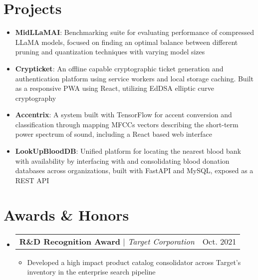 \documentclass[letterpaper,11pt]{article}
\makeatletter
\newcommand{\resumeItem}[1]{
  \item\small{
    {#1 \vspace{-1pt}}
  }
}
\newcommand{\resumeProjectHeading}[2]{
    \item
    \begin{tabular*}{0.97\textwidth}{l@{\extracolsep{\fill}}r}
      \small#1 & #2 \\
    \end{tabular*}\vspace{-7pt}
}
\newcommand{\resumeSubHeadingListStart}{\begin{itemize}[leftmargin=0.15in, label={}]}
\newcommand{\resumeSubHeadingListEnd}{\end{itemize}}
\newcommand{\resumeItemListStart}{\begin{itemize}}
\newcommand{\resumeItemListEnd}{\end{itemize}\vspace{-5pt}}
\makeatother
\begin{document}
\section{Projects}
    \resumeSubHeadingListStart
        \resumeItem{\textbf{MidLLaMAI}{: Benchmarking suite for evaluating performance of compressed LLaMA models, focused on finding an optimal balance between different pruning and quantization techniques with varying model sizes}}
        \resumeItem{\textbf{Crypticket}{: An offline capable cryptographic ticket generation and authentication platform using service workers and local storage caching. Built as a responsive PWA using React, utilizing EdDSA elliptic curve cryptography}}
        \resumeItem{\textbf{Accentrix}{: A system built with TensorFlow for accent conversion and classification through mapping MFCCs vectors describing the short-term power spectrum of sound, including a React based web interface}}
        \resumeItem{\textbf{LookUpBloodDB}{: Unified platform for locating the nearest blood bank with availability by interfacing with and consolidating blood donation databases across organizations, built with FastAPI and MySQL, exposed as a REST API}}
    \resumeSubHeadingListEnd


\section{Awards \& Honors}
    \resumeSubHeadingListStart
      \resumeProjectHeading
          {\textbf{R\&D Recognition Award} $|$ \emph{Target Corporation}}{Oct. 2021}
          \resumeItemListStart
            \resumeItem{Developed a high impact product catalog consolidator across Target's inventory in the enterprise search pipeline}
          \resumeItemListEnd
    \resumeSubHeadingListEnd


\end{document}
